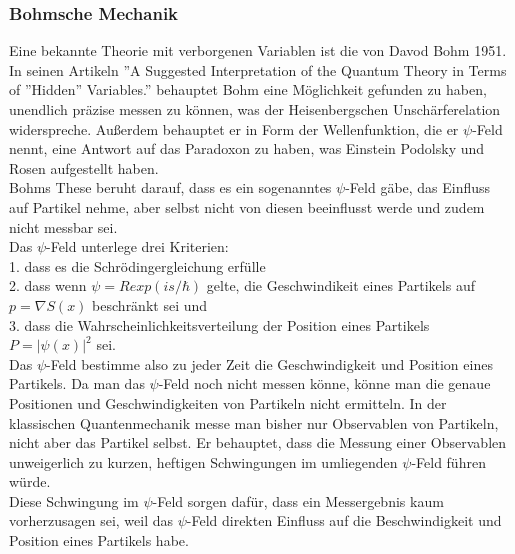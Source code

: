 \subsubsection{Bohmsche Mechanik}
\label{subsubsec:bohmsche_mechanik}
Eine bekannte Theorie mit verborgenen Variablen ist die von Davod Bohm 1951. In seinen Artikeln ''A Suggested Interpretation of the Quantum Theory in Terms of ''Hidden'' Variables.''  behauptet Bohm eine Möglichkeit gefunden zu haben, unendlich präzise messen zu können, was der Heisenbergschen Unschärferelation widerspreche. Außerdem behauptet er in Form der Wellenfunktion, die er $\psi$-Feld nennt, eine Antwort auf das Paradoxon zu haben, was Einstein Podolsky und Rosen aufgestellt haben.\\
Bohms These beruht darauf, dass es ein sogenanntes $\psi$-Feld gäbe, das Einfluss auf Partikel nehme, aber selbst nicht von diesen beeinflusst werde und zudem nicht messbar sei. \\
Das $\psi$-Feld unterlege drei Kriterien:\\
1. dass es die Schrödingergleichung erfülle\\
2. dass wenn $\psi=R exp(is/\hbar)$ gelte, die Geschwindikeit eines Partikels auf $p=\nabla S(x)$ beschränkt sei und \\
3. dass die Wahrscheinlichkeitsverteilung der Position eines Partikels $P=|\psi(x)|^2$ sei. \\
Das $\psi$-Feld bestimme also zu jeder Zeit die Geschwindigkeit und Position eines Partikels. Da man das $\psi$-Feld noch nicht messen könne, könne man die genaue Positionen und Geschwindigkeiten von Partikeln nicht ermitteln.
In der klassischen Quantenmechanik messe man bisher nur Observablen von Partikeln, nicht aber das Partikel selbst. Er behauptet, dass die Messung einer Observablen unweigerlich zu kurzen, heftigen Schwingungen im umliegenden $\psi$-Feld führen würde.\\
Diese Schwingung im $\psi$-Feld sorgen dafür, dass ein Messergebnis kaum vorherzusagen sei, weil das $\psi$-Feld direkten Einfluss auf die Beschwindigkeit und Position eines Partikels habe. \\\\
